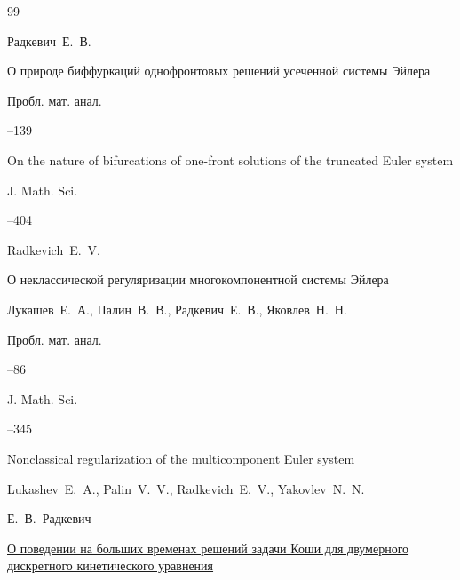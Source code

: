 \begin{thebibliography}{99}

\by Радкевич~Е.~В.

\paper О природе биффуркаций однофронтовых решений усеченной системы Эйлера

\jour Пробл. мат. анал.



–139

\transl

\paper On the nature of bifurcations of one-front solutions of the truncated Euler system


\jour J. Math. Sci.




--404

\by Radkevich~E.~V. 







\paper  О неклассической регуляризации многокомпонентной системы Эйлера

\by Лукашев~Е.~А., Палин~В.~В., Радкевич~Е.~В., Яковлев~Н.~Н.

\jour Пробл. мат. анал.



–86

\transl

\jour J. Math. Sci.





–345 

\paper Nonclassical regularization of the multicomponent Euler system

\by \linebreak Lukashev~E.~A., Palin~V.~V., Radkevich~E.~V., Yakovlev~N.~N.






\by Е.~В.~Радкевич

\paper \href{http://mi.mathnet.ru/cmfd225}{О поведении на больших временах решений задачи Коши для двумерного дискретного кинетического уравнения}


\end{thebibliography}
